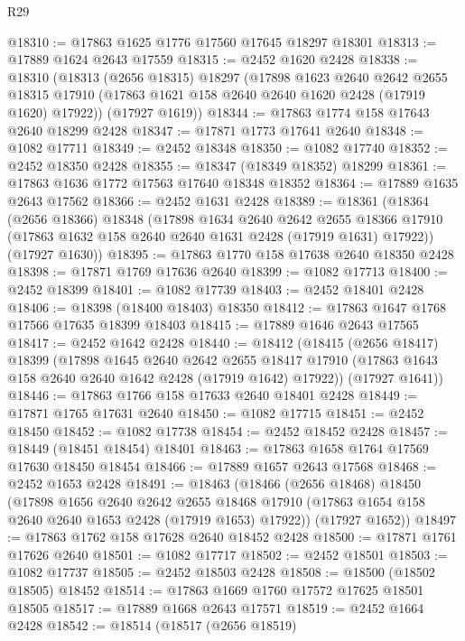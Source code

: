 \begin{lexlean}{R29}
\begin{coremodule}
@18310 := @17863 @1625 @1776 @17560 @17645 @18297 @18301
@18313 := @17889 @1624 @2643 @17559
@18315 := @2452 @1620 @2428
@18338 := @18310
    (@18313
      (@2656 @18315)
      @18297
      (@17898
        @1623
        @2640
        @2642
        @2655
        @18315
        @17910
        (@17863 @1621 @158 @2640 @2640 @1620 @2428 (@17919 @1620) @17922))
      (@17927 @1619))
@18344 := @17863 @1774 @158 @17643 @2640 @18299 @2428
@18347 := @17871 @1773 @17641 @2640
@18348 := @1082 @17711
@18349 := @2452 @18348
@18350 := @1082 @17740
@18352 := @2452 @18350 @2428
@18355 := @18347 (@18349 @18352) @18299
@18361 := @17863 @1636 @1772 @17563 @17640 @18348 @18352
@18364 := @17889 @1635 @2643 @17562
@18366 := @2452 @1631 @2428
@18389 := @18361
    (@18364
      (@2656 @18366)
      @18348
      (@17898
        @1634
        @2640
        @2642
        @2655
        @18366
        @17910
        (@17863 @1632 @158 @2640 @2640 @1631 @2428 (@17919 @1631) @17922))
      (@17927 @1630))
@18395 := @17863 @1770 @158 @17638 @2640 @18350 @2428
@18398 := @17871 @1769 @17636 @2640
@18399 := @1082 @17713
@18400 := @2452 @18399
@18401 := @1082 @17739
@18403 := @2452 @18401 @2428
@18406 := @18398 (@18400 @18403) @18350
@18412 := @17863 @1647 @1768 @17566 @17635 @18399 @18403
@18415 := @17889 @1646 @2643 @17565
@18417 := @2452 @1642 @2428
@18440 := @18412
    (@18415
      (@2656 @18417)
      @18399
      (@17898
        @1645
        @2640
        @2642
        @2655
        @18417
        @17910
        (@17863 @1643 @158 @2640 @2640 @1642 @2428 (@17919 @1642) @17922))
      (@17927 @1641))
@18446 := @17863 @1766 @158 @17633 @2640 @18401 @2428
@18449 := @17871 @1765 @17631 @2640
@18450 := @1082 @17715
@18451 := @2452 @18450
@18452 := @1082 @17738
@18454 := @2452 @18452 @2428
@18457 := @18449 (@18451 @18454) @18401
@18463 := @17863 @1658 @1764 @17569 @17630 @18450 @18454
@18466 := @17889 @1657 @2643 @17568
@18468 := @2452 @1653 @2428
@18491 := @18463
    (@18466
      (@2656 @18468)
      @18450
      (@17898
        @1656
        @2640
        @2642
        @2655
        @18468
        @17910
        (@17863 @1654 @158 @2640 @2640 @1653 @2428 (@17919 @1653) @17922))
      (@17927 @1652))
@18497 := @17863 @1762 @158 @17628 @2640 @18452 @2428
@18500 := @17871 @1761 @17626 @2640
@18501 := @1082 @17717
@18502 := @2452 @18501
@18503 := @1082 @17737
@18505 := @2452 @18503 @2428
@18508 := @18500 (@18502 @18505) @18452
@18514 := @17863 @1669 @1760 @17572 @17625 @18501 @18505
@18517 := @17889 @1668 @2643 @17571
@18519 := @2452 @1664 @2428
@18542 := @18514
    (@18517
      (@2656 @18519)

\end{coremodule}
\end{lexlean}
